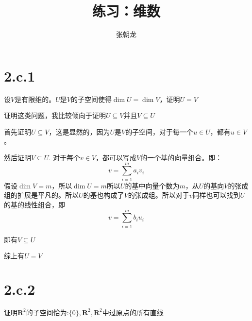 \documentclass[10pt,a4paper,UTF8]{article}
\author{张朝龙}
\date{}
\title{练习：维数}
\begin{document}
\maketitle
\tableofcontents
{}

\section{2.c.1}
\label{sec:org510ab6e}


\begin{problem}
设\(V\)是有限维的。\(U\)是\(V\)的子空间使得\(\dim U = \dim V\)，证明\(U=V\)
\end{problem}

\begin{answer}
证明这类问题，我比较倾向于证明\(U\subseteq V\)并且\(V\subseteq U\)

首先证明\(U\subseteq V\)，这是显然的，因为\(U\)是\(V\)的子空间，对于每一个\(u\in U\)，都有\(u\in V\)。

然后证明\(V\subseteq U\). 对于每个\(v\in V\)，都可以写成\(V\)的一个基的向量组合。即：\[v = \sum_{i=1}^{m} a_{i}v_{i}\]
假设\(\dim V=m\)，所以\(\dim U=m\)所以\(U\)的基中向量个数为\(m\)，从\(U\)的基向\(V\)的张成组的扩展是平凡的。所以\(U\)的基也构成了\(V\)的张成组。所以对于\(v\)同样也可以找到\(U\)的基的线性组合，即\[v = \sum_{i=1}^{m}b_{i}u_{i}\]

即有\(V\subseteq U\)

综上有\(U=V\)
\end{answer}
\section{2.c.2}
\label{sec:org55b9790}


\begin{problem}
证明\(\mathbf{R}^{2}\)的子空间恰为:\(\{0\},\mathbf{R}^{2}, \mathbf{R}^{2}\)中过原点的所有直线
\end{problem}
\end{document}
